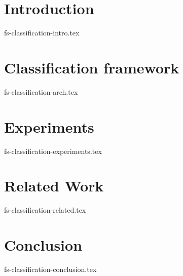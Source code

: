 \documentclass[sigconf]{acmart}
\theoremstyle{remark}
\begin{document}
\thispagestyle{empty}

\section {Introduction}
 {fs-classification-intro.tex}

\section {Classification framework}
 {fs-classification-arch.tex}

\section {Experiments}
 {fs-classification-experiments.tex}

\section{Related Work}
 {fs-classification-related.tex}

\section {Conclusion}
 {fs-classification-conclusion.tex}



\end{document}
